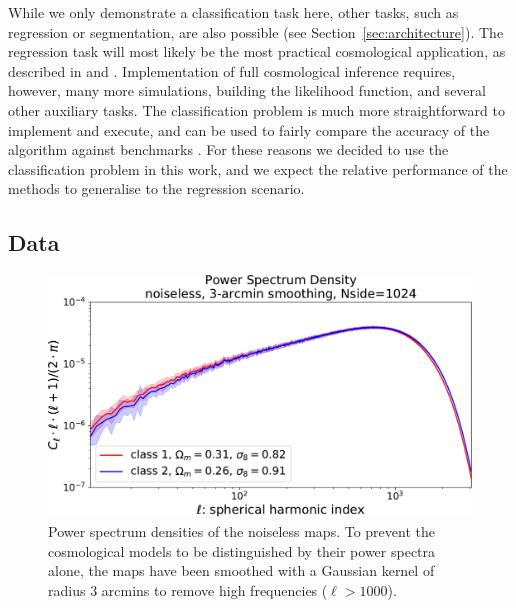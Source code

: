 \documentclass[final,twocolumn,3p,times,sort&compress]{elsarticle}
\newcommand{\secref}[1]{Section~\ref{sec:#1}}
\newcommand{\1}{\b{1}}              %
\newcommand{\0}{\b{0}}              %
\begin{document}
While we only demonstrate a classification task here, other tasks, such as regression or segmentation, are also possible (see \secref{architecture}).
The regression task will most likely be the most practical cosmological application, as described in \citep{gupta2018nongaussianinformation} and \citep{fluri2018deep}.
Implementation of full cosmological inference requires, however, many more simulations, building the likelihood function, and several other auxiliary tasks.
The classification problem is much more straightforward to implement and execute, and can be used to fairly compare the accuracy of the algorithm against benchmarks \citep{schmelze2017cosmologicalmodel}.
For these reasons we decided to use the classification problem in this work, and we expect the relative performance of the methods to generalise to the regression scenario.

\subsection{Data}
\label{sec:data}

\begin{figure}
	\centering
	\includegraphics[width=\linewidth]{psd_sigma3}
	\caption{Power spectrum densities of the noiseless maps.
		To prevent the cosmological models to be distinguished by their power spectra alone, the maps have been smoothed with a Gaussian kernel of radius $3$ arcmins to remove high frequencies ($\ell>1000$).}
	\label{fig:psd_sigma3}
\end{figure}
\end{document}

